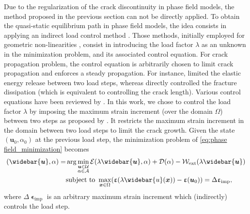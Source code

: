 \documentclass[OptSoft]{jtcam_preprint}
\newcommand{\xx}{\bm{x}}
\newcommand{\uu}{\bm{u}}
\newcommand{\eps}{\bm{\upvarepsilon}}
\begin{document}
Due to the regularization of the crack discontinuity in phase field models, the method proposed in the previous section can not be directly applied.
To obtain the quasi-static equilibrium path in phase field models, the idea consists in applying an indirect load control method \parencite{rastiello_path-following_2022}.
Those methods, initially employed for geometric non-linearities \parencite{wempner_discrete_1971,riks_application_1972, riks_incremental_1979, crisfield_fast_1981}, consist in introducing the load factor $\lambda$ as an unknown in the minimization problem, and its associated control equation.
For crack propagation problem, the control equation is arbitrarily chosen to limit crack propagation and enforces a steady propagation.
For instance, \textcite{gutierrez_energy_2004} limited the elastic energy release between two load steps, whereas \textcite{singh_fracture-controlled_2016} directly controlled the fracture dissipation (which is equivalent to controlling the crack length).
Various control equations have been reviewed by \textcite{rastiello_path-following_2022}.
In this work, we chose to control the load factor $\lambda$ by imposing the maximum strain increment (over the domain $\Omega$) between two steps as proposed by \textcite{chen_secant_1991}.
It restricts the maximum strain increment in the domain between two load steps to limit the crack growth.
Given the state $(\uu_0, \alpha_0)$ at the previous load step, the minimization problem of \cref{eq:phase field_minimization} becomes
\begin{equation}
  \label{eq:phase field_with_path-following}
  \begin{split}
    (\widebar{\uu}, \alpha) = & \arg\min_{\substack{\uu \in \mathcal{U} \\ \alpha \in \mathcal{A}}}
      \mathcal{E}(\lambda \widebar{\uu}, \alpha) + \mathcal{D}(\alpha) - \mathcal{W}_{\mathrm{ext}} (\lambda \widebar{\uu}) \\
    & \text{subject to } \max_{\xx \in \Omega} (\eps(\lambda \widebar{u}(\xx)) - \eps(\uu_0)) = \Delta \eps_{\mathrm{imp}},
  \end{split}
\end{equation}
where $\Delta \eps_{\mathrm{imp}}$ is an arbitrary maximum strain increment which (indirectly) controls the load step.
\end{document}
